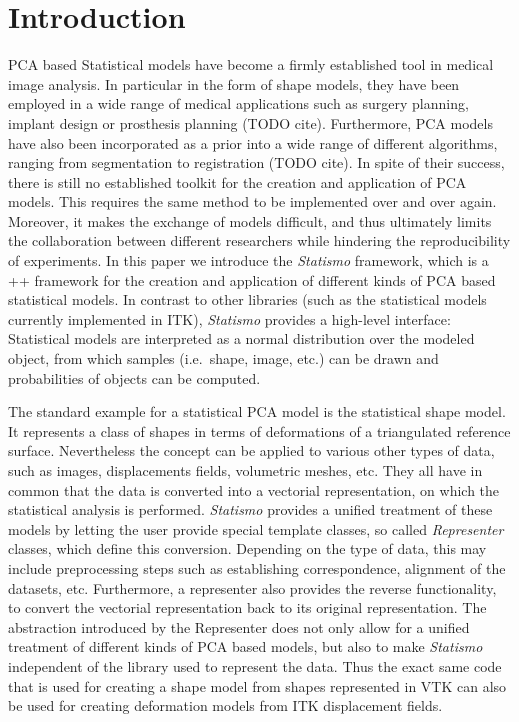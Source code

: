 \documentclass{InsightArticle}
\newcommand{\Statismo}{\emph{Statismo}\xspace}
\begin{document}
\tableofcontents

\section{Introduction}

PCA based Statistical models have become a firmly established tool in
medical image analysis. In particular in the form of shape models,
they have been employed in a wide range of medical applications such
as surgery planning, implant design or prosthesis planning (TODO
cite). Furthermore, PCA models have also been incorporated as a prior
into a wide range of different algorithms, ranging from segmentation
to registration (TODO cite).  In spite of their success, there is
still no established toolkit for the creation and
application of PCA models. This requires the same method to be
implemented over and over again. Moreover, it makes the exchange of
models difficult, and thus ultimately limits the collaboration between
different researchers while hindering  the reproducibility of experiments.
In this paper we introduce the \Statismo framework, which is a \C++
framework for the creation and application of different kinds of PCA
based statistical models.  In contrast to other libraries (such as the statistical models currently
implemented in ITK), \Statismo provides a high-level interface: 
Statistical models are interpreted as a normal distribution
over the modeled object, from which samples (i.e.\ shape, image, etc.)
can be drawn and probabilities of objects can be
computed. 

The standard example for a statistical PCA model is the statistical
shape model.  It represents a class of shapes in terms of deformations
of a triangulated reference surface. Nevertheless the concept can be
applied to various other types of data, such as
images, displacements fields, volumetric meshes, etc.  They all have in
common that the data is converted into a vectorial representation, on
which the statistical analysis is performed.  \Statismo provides a
unified treatment of these models by letting the user provide special
template classes, so called \emph{Representer} classes, which define
this conversion.  Depending on the type of data, this may include
preprocessing steps such as establishing correspondence, alignment of
the datasets, etc.  Furthermore, a representer also provides the
reverse functionality, to convert the vectorial representation back to
its original representation.  The abstraction introduced by the
Representer does not only allow for a unified treatment of different kinds of PCA based models, but also to make \Statismo
independent of the library used to represent the data. Thus 
the exact same code that is used for creating a shape model from shapes
represented in VTK can also be used for creating deformation models from
ITK displacement fields.
\end{document}
